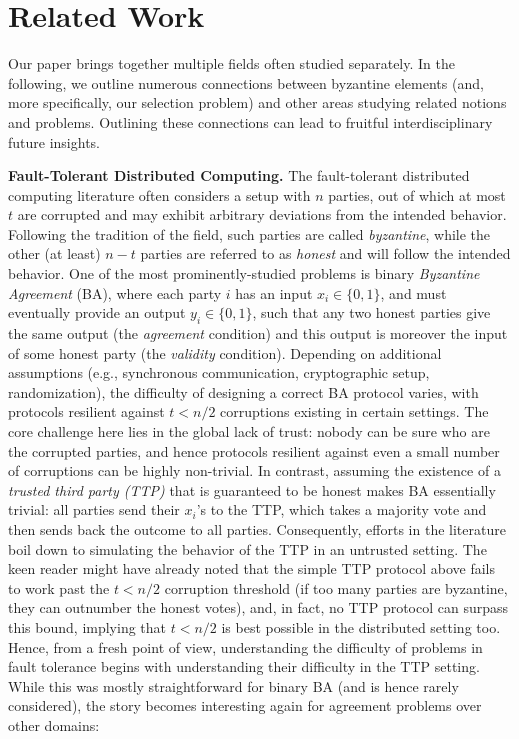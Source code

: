 \section{Related Work}
Our paper brings together multiple fields often studied separately. In the following, we outline numerous connections between byzantine elements (and, more specifically, our selection problem) and other areas studying related notions and problems. Outlining these connections can lead to fruitful interdisciplinary future insights.

\noindent \textbf{Fault-Tolerant Distributed Computing.} The fault-tolerant distributed computing literature often considers a setup with $n$ parties, out of which at most $t$ are corrupted and may exhibit arbitrary deviations from the intended behavior. Following the tradition of the field, such parties are called \emph{byzantine}, while the other (at least) $n - t$ parties are referred to as \emph{honest} and will follow the intended behavior. One of the most prominently-studied problems is binary \emph{Byzantine Agreement} (BA), where each party $i$ has an input $x_i \in \{0, 1\}$, and must eventually provide an output $y_i \in \{0, 1\}$, such that any two honest parties give the same output (the \emph{agreement} condition) and this output is moreover the input of some honest party (the \emph{validity} condition). 
Depending on additional assumptions (e.g., synchronous communication, cryptographic setup, randomization), the difficulty of designing a correct BA protocol varies, with protocols resilient against $t < n/2$ corruptions existing in certain settings.
The core challenge here lies in the global lack of trust: nobody can be sure who are the corrupted parties, and hence protocols resilient against even a small number of corruptions can be highly non-trivial.
In contrast, assuming the existence of a \emph{trusted third party (TTP)} that is guaranteed to be honest makes BA essentially trivial: all parties send their $x_i$'s to the TTP, which takes a majority vote and then sends back the outcome to all parties. Consequently, efforts in the literature boil down to simulating the behavior of the TTP in an untrusted setting. The keen reader might have already noted that the simple TTP protocol above fails to work past the $t < n/2$ corruption threshold (if too many parties are byzantine, they can outnumber the honest votes), and, in fact, no TTP protocol can surpass this bound, implying that $t < n/2$ is best possible in the distributed setting too.
Hence, from a fresh point of view, understanding the difficulty of problems in fault tolerance begins with understanding their difficulty in the TTP setting. While this was mostly straightforward for binary BA (and is hence rarely considered), the story becomes interesting again for agreement problems over other domains:

